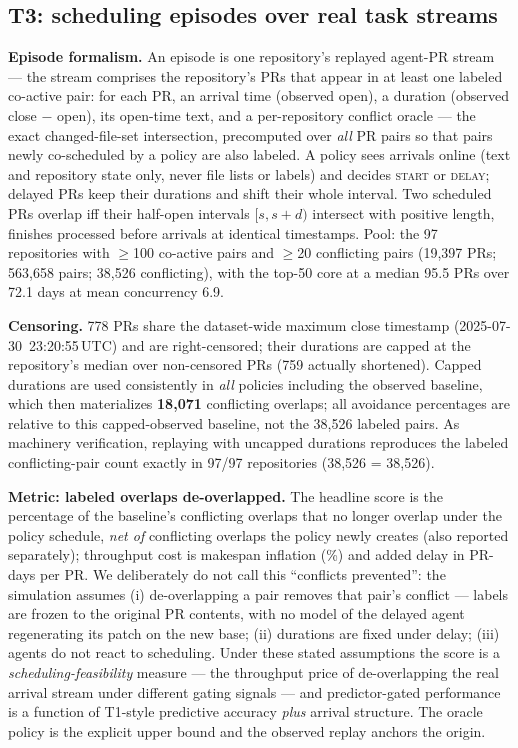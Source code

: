 \documentclass{article}
\begin{document}
\subsection{T3: scheduling episodes over real task streams}
\label{sec:t3}

\textbf{Episode formalism.} An episode is one repository's replayed agent-PR stream --- the stream comprises the repository's PRs that appear in at least one labeled co-active pair: for each PR, an arrival time (observed open), a duration (observed close $-$ open), its open-time text, and a per-repository conflict oracle --- the exact changed-file-set intersection, precomputed over \emph{all} PR pairs so that pairs newly co-scheduled by a policy are also labeled. A policy sees arrivals online (text and repository state only, never file lists or labels) and decides \textsc{start} or \textsc{delay}; delayed PRs keep their durations and shift their whole interval. Two scheduled PRs overlap iff their half-open intervals $[s, s+d)$ intersect with positive length, finishes processed before arrivals at identical timestamps. Pool: the 97 repositories with $\geq$100 co-active pairs and $\geq$20 conflicting pairs (19{,}397 PRs; 563{,}658 pairs; 38{,}526 conflicting), with the top-50 core at a median 95.5 PRs over 72.1 days at mean concurrency 6.9. %

\textbf{Censoring.} 778 PRs share the dataset-wide maximum close timestamp (2025-07-30~23:20:55\,UTC) and are right-censored; their durations are capped at the repository's median over non-censored PRs (759 actually shortened). %
Capped durations are used consistently in \emph{all} policies including the observed baseline, which then materializes \textbf{18{,}071} conflicting overlaps; all avoidance percentages are relative to this capped-observed baseline, not the 38{,}526 labeled pairs. As machinery verification, replaying with uncapped durations reproduces the labeled conflicting-pair count exactly in 97/97 repositories (38{,}526 = 38{,}526). %

\textbf{Metric: labeled overlaps de-overlapped.} The headline score is the percentage of the baseline's conflicting overlaps that no longer overlap under the policy schedule, \emph{net of} conflicting overlaps the policy newly creates (also reported separately); throughput cost is makespan inflation (\%) and added delay in PR-days per PR. We deliberately do not call this ``conflicts prevented'': the simulation assumes (i) de-overlapping a pair removes that pair's conflict --- labels are frozen to the original PR contents, with no model of the delayed agent regenerating its patch on the new base; (ii) durations are fixed under delay; (iii) agents do not react to scheduling. %
Under these stated assumptions the score is a \emph{scheduling-feasibility} measure --- the throughput price of de-overlapping the real arrival stream under different gating signals --- and predictor-gated performance is a function of T1-style predictive accuracy \emph{plus} arrival structure. The oracle policy is the explicit upper bound and the observed replay anchors the origin.
\end{document}
